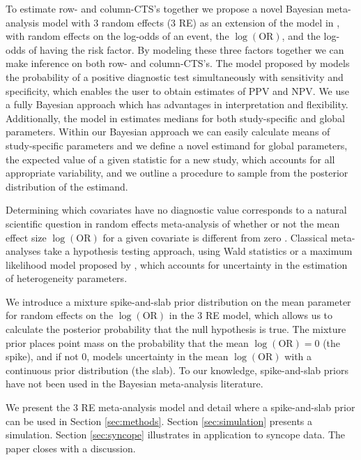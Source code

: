 \documentclass[AMA,STIX1COL]{WileyNJD-v2}
\begin{document}
To estimate row- and column-CTS's together we propose a novel Bayesian meta-analysis model with 3 random effects (3 RE) as an extension of the model in \citet{smith1995}, with random effects on the log-odds of an event, the $\log(\mbox{OR})$, and the log-odds of having the risk factor. By modeling these three factors together we can make inference on both row- and column-CTS's. The model proposed by \citet{chu2009} models the probability of a positive diagnostic test simultaneously with sensitivity and specificity, which enables the user to obtain estimates of PPV and NPV. We use a fully Bayesian approach which has advantages in interpretation and flexibility. Additionally, the model in \citet{chu2009} estimates medians for both study-specific and global parameters. Within our Bayesian approach we can easily calculate means of study-specific parameters and we define a novel estimand for global parameters, the expected value of a given statistic for a new study, which accounts for all appropriate variability, and we outline a procedure to sample from the posterior distribution of the estimand. 

Determining which covariates have no diagnostic value corresponds to a natural scientific question in random effects meta-analysis of whether or not the mean effect size $\log(\mbox{OR})$ for a given covariate is different from zero \citep{higgins2009}. Classical meta-analyses take a hypothesis testing approach, using Wald statistics \citep{higgins2009, follmann1999} or a maximum likelihood model proposed by \citet{hardy1996}, which accounts for uncertainty in the estimation of heterogeneity parameters. 

We introduce a mixture spike-and-slab prior distribution \citep{GM1993, GM1997, KM1998, ishwaran2005} on the mean parameter for random effects on the $\log(\mbox{OR})$ in the 3 RE model, which allows us to calculate the posterior probability that the null hypothesis is true. The mixture prior places point mass on the probability that the mean $\log(\mbox{OR}) = 0$ (the spike), and if not 0, models uncertainty in the mean $\log(\mbox{OR})$ with a continuous prior distribution (the slab). To our knowledge, spike-and-slab priors have not been used in the Bayesian meta-analysis literature. 

We present the 3 RE meta-analysis model and detail where a spike-and-slab prior can be used in Section \ref{sec:methods}. Section \ref{sec:simulation} presents a simulation. Section \ref{sec:syncope} illustrates in application to syncope data. The paper closes with a discussion. 
\end{document}
